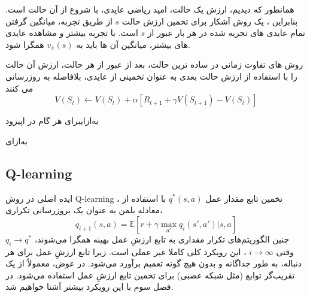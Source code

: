 همانطور که دیدیم، ارزش یک حالت، امید ریاضی عایدی، با شروع از آن حالت است.
بنابراین ، یک روش آشکار برای تخمین ارزش حالت $s$ از طریق تجربه، میانگین گرفتن تمام عایدی های تجربه شده در هر بار عبور از $s$ است.
با تجربه بیشتر و مشاهده عایدی های بیشتر، میانگین آن ها باید به $v_\pi(s)$ همگرا شود.

روش های تفاوت زمانی در ساده ترین حالت، بعد از عبور از هر حالت، ارزش آن حالت را با استفاده از ارزش حالت بعدی به عنوان تخمینی از عایدی، بلافاصله به روزرسانی می کنند
$$V(S_t) \longleftarrow V(S_t) + \alpha\left[R_{t+1} + \gamma V(S_{t+1}) - V(S_t)\right]$$

\‌به‌ازای{برای هر گام در اپیزود}

‌به‌ازای


\subsection{Q-learning}
ایده اصلی در روش 
Q-learning
، تخمین تابع مقدار عمل  
$q^*(s,a)$ 
با استفاده از معادله بلمن به عنوان یک بروزرسانی تکراری،
$$q_{i+1}(s,a) = \mathbb{E}[r+ \gamma \max_{a'} q_i(s',a')|s,a]$$
چنین الگوریتم‌های تکرار مقداری به تابع ارزشِ عمل بهینه همگرا می‌شوند، 
$q_i \longrightarrow q^*$
وقتی
$i \longrightarrow \infty$
، این رویکرد کلی کاملا غیر عملی است.
زیرا تابع ارزشِ عمل برای هر دنباله، به طور جداگانه و بدون هیچ گونه تعمیم برآورد می‌شود. در عوض، معمولاً از یک تقریب‌گر توابع (مثل شبکه عصبی) برای تخمین تابع ارزشِ عمل استفاده می‌شود. در فصل سوم با این رویکرد بیشتر آشنا خواهیم شد.